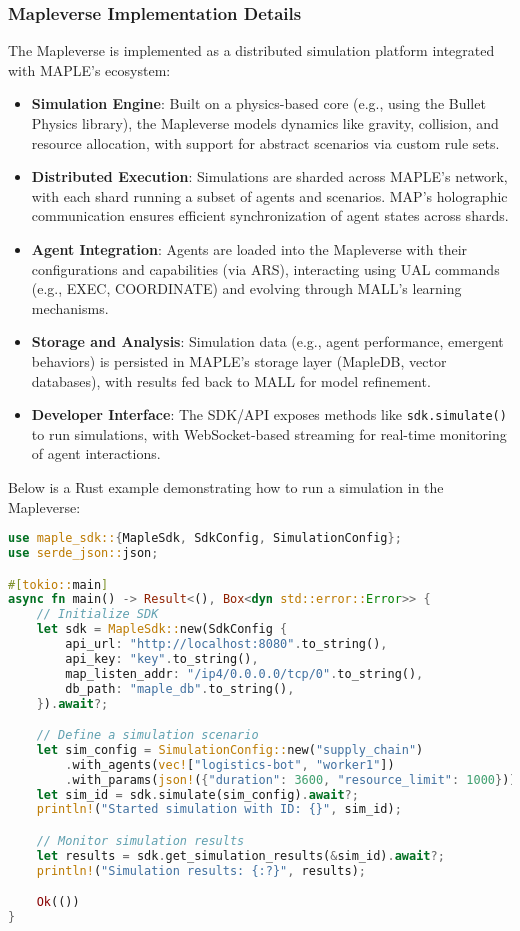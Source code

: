 \documentclass[a4paper,11pt]{article}
\begin{document}
\subsubsection{Mapleverse Implementation Details}
The Mapleverse is implemented as a distributed simulation platform integrated with MAPLE’s ecosystem:
\begin{itemize}[leftmargin=*]
    \item \textbf{Simulation Engine}: Built on a physics-based core (e.g., using the Bullet Physics library), the Mapleverse models dynamics like gravity, collision, and resource allocation, with support for abstract scenarios via custom rule sets.
    \item \textbf{Distributed Execution}: Simulations are sharded across MAPLE’s network, with each shard running a subset of agents and scenarios. MAP’s holographic communication ensures efficient synchronization of agent states across shards.
    \item \textbf{Agent Integration}: Agents are loaded into the Mapleverse with their configurations and capabilities (via ARS), interacting using UAL commands (e.g., EXEC, COORDINATE) and evolving through MALL’s learning mechanisms.
    \item \textbf{Storage and Analysis}: Simulation data (e.g., agent performance, emergent behaviors) is persisted in MAPLE’s storage layer (MapleDB, vector databases), with results fed back to MALL for model refinement.
    \item \textbf{Developer Interface}: The SDK/API exposes methods like \texttt{sdk.simulate()} to run simulations, with WebSocket-based streaming for real-time monitoring of agent interactions.
\end{itemize}

Below is a Rust example demonstrating how to run a simulation in the Mapleverse:
\begin{lstlisting}[language=Rust, caption={Rust Mapleverse Example}, label={lst:mapleverse-sim}]
use maple_sdk::{MapleSdk, SdkConfig, SimulationConfig};
use serde_json::json;

#[tokio::main]
async fn main() -> Result<(), Box<dyn std::error::Error>> {
    // Initialize SDK
    let sdk = MapleSdk::new(SdkConfig {
        api_url: "http://localhost:8080".to_string(),
        api_key: "key".to_string(),
        map_listen_addr: "/ip4/0.0.0.0/tcp/0".to_string(),
        db_path: "maple_db".to_string(),
    }).await?;

    // Define a simulation scenario
    let sim_config = SimulationConfig::new("supply_chain")
        .with_agents(vec!["logistics-bot", "worker1"])
        .with_params(json!({"duration": 3600, "resource_limit": 1000}));
    let sim_id = sdk.simulate(sim_config).await?;
    println!("Started simulation with ID: {}", sim_id);

    // Monitor simulation results
    let results = sdk.get_simulation_results(&sim_id).await?;
    println!("Simulation results: {:?}", results);

    Ok(())
}
\end{lstlisting}
\vspace{0.5cm}
\end{document}
